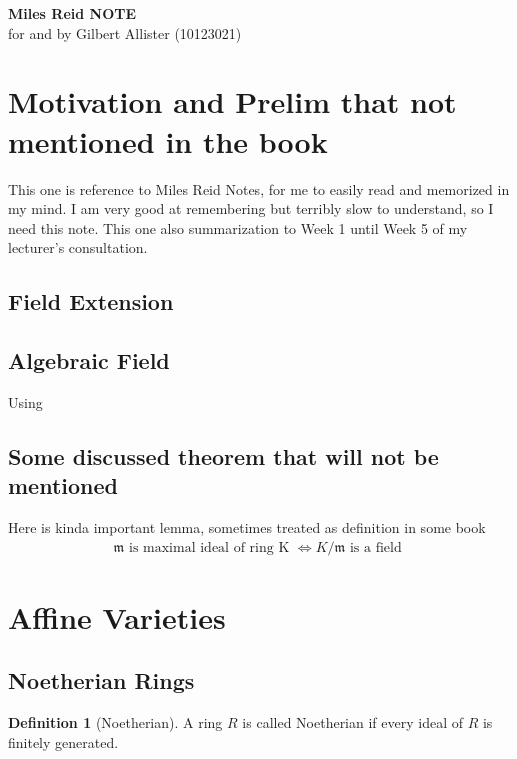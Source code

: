 \documentclass[12pt, a4paper]{article}
\theoremstyle{definition}
\newtheorem{definition}[theorem]{Definition}
\begin{document}
    \thispagestyle{firstpage}

    \begin{center}
        \vspace*{0.8cm}
        {\large\bfseries Miles Reid NOTE} \\[0.6cm]
        {\normalsize for and by Gilbert Allister (10123021)}
        \vspace*{0.8cm}
    \end{center}



    \section{Motivation and Prelim that not mentioned in the book}
    This one is reference to Miles Reid Notes, for me to easily read and memorized in my mind. I am very good at remembering but terribly slow to understand, so I need this note. This one also summarization to Week 1 until Week 5 of my lecturer's consultation. 

    \subsection{Field Extension}


    \subsection{Algebraic Field}
    Using 


    \subsection{Some discussed theorem that will not be mentioned}
    Here is kinda important lemma, sometimes treated as definition in some book 
    \begin{align*}
      \mathfrak{m} \text{ is maximal ideal of ring K }\Leftrightarrow K/\mathfrak{m} \text{ is a field }
    \end{align*}
    
    \section{Affine Varieties}
    \subsection{Noetherian Rings}
    \begin{definition}[Noetherian]
        A ring $R$ is called Noetherian if every ideal of $R$ is finitely generated.     
    \end{definition}
\end{document}
